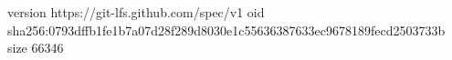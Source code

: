 version https://git-lfs.github.com/spec/v1
oid sha256:0793dffb1fe1b7a07d28f289d8030e1c55636387633ec9678189fecd2503733b
size 66346
